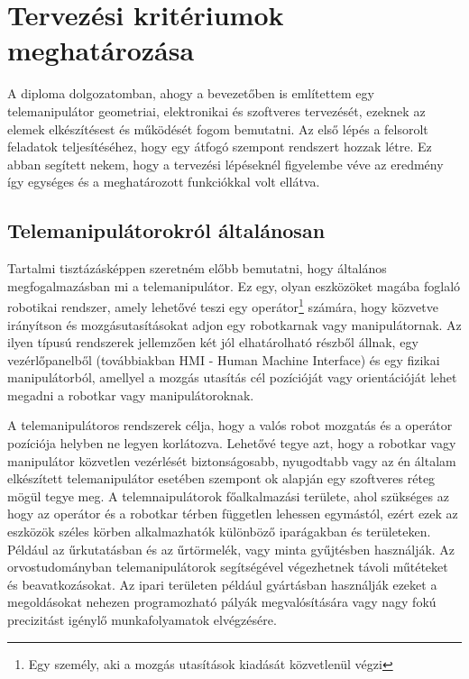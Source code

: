 \chapter{Tervezési kritériumok meghatározása}
\label{sec:LatexTools}

A diploma dolgozatomban, ahogy a bevezetőben is említettem egy telemanipulátor geometriai, elektronikai és szoftveres tervezését, ezeknek az elemek elkészítésest és működését fogom bemutatni. Az első lépés a felsorolt feladatok teljesítéséhez, hogy egy átfogó szempont rendszert hozzak létre. Ez abban segített nekem, hogy a tervezési lépéseknél figyelembe véve az eredmény így egységes és a meghatározott funkciókkal volt ellátva.  

\section{Telemanipulátorokról általánosan}

Tartalmi tisztázásképpen szeretném előbb bemutatni, hogy általános megfogalmazásban mi a telemanipulátor. Ez egy, olyan eszközöket magába foglaló robotikai rendszer, amely lehetővé teszi egy operátor\footnote{Egy személy, aki a mozgás utasítások kiadását közvetlenül végzi} számára, hogy közvetve irányítson és mozgásutasításokat adjon egy robotkarnak vagy manipulátornak. Az ilyen típusú rendszerek jellemzően két jól elhatárolható részből állnak, egy vezérlőpanelből (továbbiakban HMI - Human Machine Interface) és egy fizikai manipulátorból, amellyel a mozgás utasítás cél pozícióját vagy orientációját lehet megadni a robotkar vagy manipulátoroknak.

A telemanipulátoros rendszerek célja, hogy a valós robot mozgatás és a operátor pozíciója helyben ne legyen korlátozva. Lehetővé tegye azt, hogy a robotkar vagy manipulátor közvetlen vezérlését biztonságosabb, nyugodtabb vagy az én általam elkészített telemanipulátor esetében szempont ok alapján egy szoftveres réteg mögül tegye meg. A telemnaipulátorok főalkalmazási területe, ahol szükséges az hogy az operátor és a robotkar térben független lehessen egymástól, ezért ezek az eszközök széles körben alkalmazhatók különböző iparágakban és területeken. Például az űrkutatásban és az űrtörmelék, vagy minta gyűjtésben használják. Az orvostudományban telemanipulátorok segítségével végezhetnek távoli műtéteket és beavatkozásokat. Az ipari területen például gyártásban használják ezeket a megoldásokat nehezen programozható pályák megvalósítására vagy nagy fokú precizitást igénylő munkafolyamatok elvégzésére.

